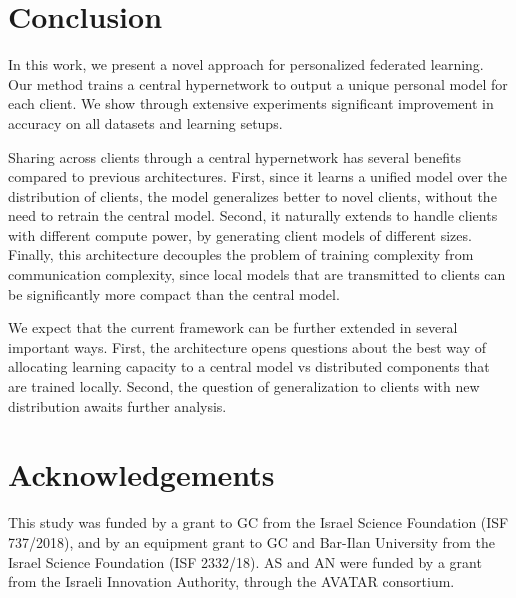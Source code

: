 \documentclass{article}
\begin{document}
\section{Conclusion}

In this work, we present a novel approach for personalized federated learning. Our method trains a central hypernetwork to output a unique personal model for each client.
We show through extensive experiments significant improvement in accuracy on all datasets and learning setups.

Sharing across clients through a central hypernetwork has several benefits compared to previous architectures. First, since it learns a unified model over the distribution of clients, the model generalizes better to novel clients, without the need to retrain the central model. Second, it naturally extends to handle clients with different compute power, by generating client models of different sizes. 
Finally, this architecture decouples the problem of training complexity from communication complexity, since local models that are transmitted to clients can be significantly more compact than the central model.

We expect that the current framework can be further extended in several important ways. First, the architecture opens questions about the best way of allocating learning capacity to a central model vs distributed components that are trained locally. Second, the question of generalization to clients with new distribution awaits further analysis. 











\nocite{langley00}

\section*{Acknowledgements}
This study was funded by a grant to GC from the Israel Science Foundation (ISF 737/2018), and by an equipment grant to GC and Bar-Ilan University from the Israel Science Foundation (ISF 2332/18). AS and AN were funded by a grant from the Israeli Innovation Authority, through the AVATAR consortium.





\clearpage
{}
\end{document}
